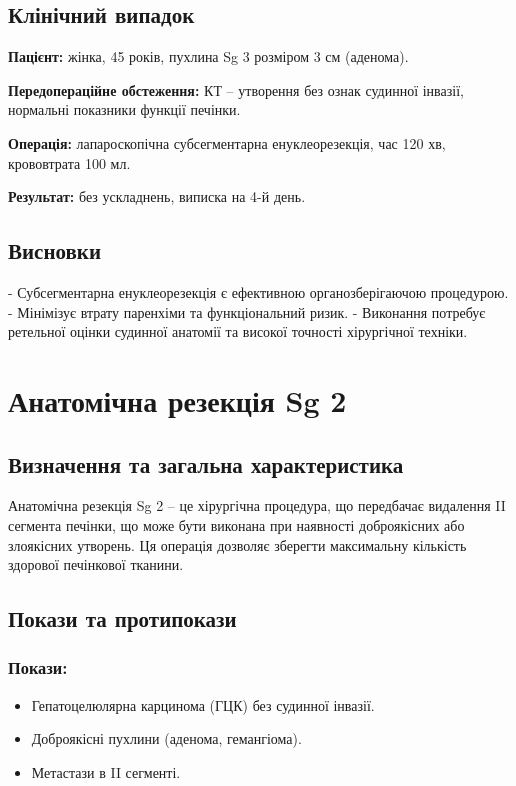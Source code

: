 \begin{refsection}
\subsection{Клінічний випадок}
\textbf{Пацієнт:} жінка, 45 років, пухлина Sg 3 розміром 3 см (аденома).

\textbf{Передопераційне обстеження:} КТ – утворення без ознак судинної інвазії, нормальні показники функції печінки.

\textbf{Операція:} лапароскопічна субсегментарна енуклеорезекція, час 120 хв, крововтрата 100 мл.

\textbf{Результат:} без ускладнень, виписка на 4-й день.

\subsection{Висновки}
- Субсегментарна енуклеорезекція є ефективною органозберігаючою процедурою.
- Мінімізує втрату паренхіми та функціональний ризик.
- Виконання потребує ретельної оцінки судинної анатомії та високої точності хірургічної техніки.
    
\section{Анатомічна резекція Sg 2}
\subsection{Визначення та загальна характеристика}
Анатомічна резекція Sg 2 – це хірургічна процедура, що передбачає видалення II сегмента печінки, що може бути виконана при наявності доброякісних або злоякісних утворень. Ця операція дозволяє зберегти максимальну кількість здорової печінкової тканини.

\subsection{Покази та протипокази}
\subsubsection{Покази:}
\begin{itemize}
    \item Гепатоцелюлярна карцинома (ГЦК) без судинної інвазії.
    \item Доброякісні пухлини (аденома, гемангіома).
    \item Метастази в II сегменті.
\end{itemize}


\end{refsection}
